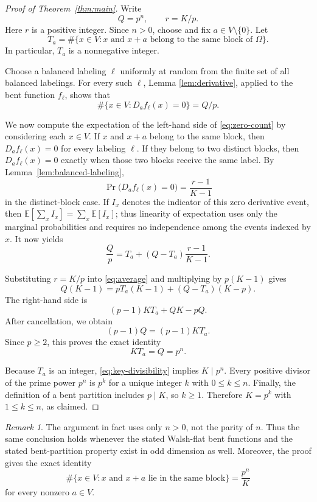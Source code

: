 \documentclass[11pt]{article}
\theoremstyle{remark}
\newtheorem*{remark}{Remark}
\begin{document}
\begin{proof}[Proof of Theorem~\ref{thm:main}]
Write
\[
  Q=p^n,\qquad r=K/p.
\]
Here $r$ is a positive integer.  Since $n>0$, choose and fix
$a\in V\setminus\{0\}$.  Let
\begin{equation}\label{eq:T-def}
  T_a=
  \#\bigl\{x\in V:\text{$x$ and $x+a$ belong to the same block of
  $\Omega$}\bigr\}.
\end{equation}
In particular, $T_a$ is a nonnegative integer.

Choose a balanced labeling $\ell$ uniformly at random from the finite
set of all balanced labelings.  For every such $\ell$, Lemma
\ref{lem:derivative}, applied to the bent function $f_\ell$, shows that
\begin{equation}\label{eq:zero-count}
  \#\{x\in V:D_a f_\ell(x)=0\}=Q/p.
\end{equation}

We now compute the expectation of the left-hand side of
\eqref{eq:zero-count} by considering each $x\in V$.  If $x$ and $x+a$
belong to the same block, then
$D_a f_\ell(x)=0$ for every labeling $\ell$.  If they belong to two
distinct blocks, then $D_a f_\ell(x)=0$ exactly when those two blocks
receive the same label.  By Lemma~\ref{lem:balanced-labeling},
\[
  \Pr\bigl(D_a f_\ell(x)=0\bigr)
  =\frac{r-1}{K-1}
\]
in the distinct-block case.  If $I_x$ denotes the indicator of this zero
derivative event, then
$\mathbb E[\sum_x I_x]=\sum_x\mathbb E[I_x]$; thus linearity of
expectation uses only the marginal probabilities and requires no
independence among the events indexed by $x$.  It now yields
\begin{equation}\label{eq:average}
  \frac{Q}{p}
  =T_a+(Q-T_a)\frac{r-1}{K-1}.
\end{equation}

Substituting $r=K/p$ into \eqref{eq:average} and multiplying by
$p(K-1)$ gives
\[
  Q(K-1)
  =pT_a(K-1)+(Q-T_a)(K-p).
\]
The right-hand side is
\[
  (p-1)KT_a+QK-pQ.
\]
After cancellation, we obtain
\[
  (p-1)Q=(p-1)KT_a.
\]
Since $p\ge2$, this proves the exact identity
\begin{equation}\label{eq:key-divisibility}
  KT_a=Q=p^n.
\end{equation}

Because $T_a$ is an integer, \eqref{eq:key-divisibility} implies
$K\mid p^n$.  Every positive divisor of the prime power $p^n$ is
$p^k$ for a unique integer $k$ with $0\le k\le n$.  Finally, the
definition of a bent partition includes $p\mid K$, so $k\ge1$.
Therefore $K=p^k$ with $1\le k\le n$, as claimed.
\end{proof}

\begin{remark}
The argument in fact uses only $n>0$, not the parity of $n$.  Thus the
same conclusion holds whenever the stated Walsh-flat bent functions and
the stated bent-partition property exist in odd dimension as well.
Moreover, the proof gives the exact identity
\[
  \#\bigl\{x\in V:\text{$x$ and $x+a$ lie in the same block}\bigr\}
  =\frac{p^n}{K}
\]
for every nonzero $a\in V$.
\end{remark}
\end{document}
